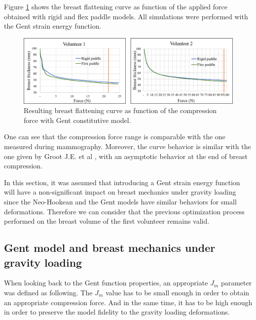 Figure \ref{fig:forceThicknessResults} shows the breast flattening curve as function of the applied force obtained with rigid and flex paddle models. All simulations were performed with the Gent strain energy function. 

\begin{figure}[!h]
\centering
\includegraphics[width=1\textwidth,keepaspectratio]{figures/forceThicknessResults.png} 
\caption{Resulting breast flattening curve as function of the compression force with Gent constitutive model. }\label{fig:forceThicknessResults}
\end{figure}
    
 One can see that the compression force range is comparable with the one measured during mammography. Moreover, the curve behavior is similar with the one given by Groot J.E. et al \citep{de_pain_2015}, with an asymptotic behavior at the end of breast compression.
 
 In this section, it was assumed that introducing a Gent strain energy function will have a non-significant impact on breast mechanics under gravity loading since the Neo-Hookean and the Gent models have similar behaviors for small deformations. Therefore we can consider that the previous optimization process performed on the breast volume of the first volunteer remains valid. 
 
 \subsection{ Gent model and breast mechanics under gravity loading}
 
 When looking back to the Gent function properties, an appropriate  $J_m$ parameter was defined as following. The $J_m$ value has to be small enough in order to obtain an appropriate compression force. And in the same time, it has to be high enough in order to preserve the model fidelity to the gravity loading deformations.
 
